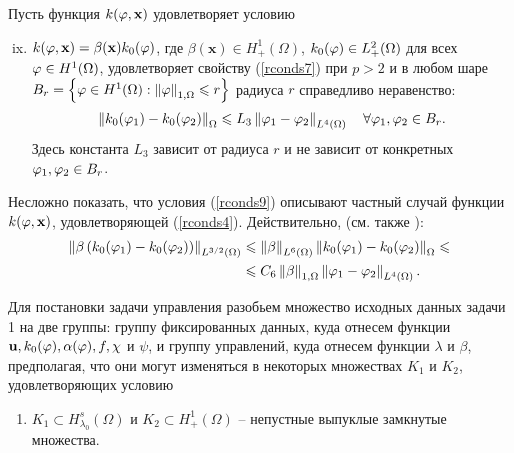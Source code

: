 Пусть функция $k(\varphi, \mathbf{x})$ удовлетворяет условию
\begin{enumerate}[(i)]
	\setcounter{enumi}{8}

	\item \label{rconds9}
		$k(\varphi, \mathbf{x}) = \beta (\mathbf{x}) k_0 (\varphi)$, где $\beta (\mathbf{x}) \in H^1_+ (\Omega)$, $k_0 (\varphi) \in L^2_+ (\Omega)$ для всех $\varphi \in H^1 (\Omega)$, удовлетворяет свойству (\ref{rconds7}) при $p>2$ и в любом шаре $B_r = \left\lbrace  \varphi \in H^1 (\Omega): \left\Vert \varphi \right\Vert_{1,\Omega} \leqslant r  \right\rbrace$ радиуса $r$ справедливо неравенство:
		\begin{equation}
			\label{x_eq}
			\left\Vert k_0 (\varphi_1) - k_0 (\varphi_2)  \right\Vert_{\Omega} 
			\leqslant L_3 \left\Vert \varphi_1 - \varphi_2 \right\Vert_{L^4 (\Omega)} 
			\quad \forall \varphi_1, \varphi_2 \in B_r.
		\end{equation}
		Здесь константа $L_3$ зависит от радиуса $r$ и не зависит от конкретных $\varphi_1, \varphi_2 \in B_r$.

\end{enumerate}

Несложно показать, что условия (\ref{rconds9}) описывают частный случай
функции $k(\varphi, \mathbf{x})$, удовлетворяющей (\ref{rconds4}). Действительно,
(см. также \cite{lit12}):
\[
	\begin{split}
		\left\Vert \beta \left( k_0 (\varphi_1) - k_0 (\varphi_2) \right) \right\Vert_{L^{3/2} (\Omega)} &\leqslant 
		\left\Vert \beta \right\Vert_{L^6 (\Omega)} \left\Vert k_0 (\varphi_1) - k_0 (\varphi_2) \right\Vert_\Omega \leqslant \\
		&\leqslant C_6 \left\Vert \beta \right\Vert_{1,\Omega} \left\Vert \varphi_1 - \varphi_2 \right\Vert_{L^4(\Omega)}.
	\end{split}
\]

Для постановки задачи управления разобьем множество исходных данных задачи 1 на две группы: группу фиксированных данных, куда отнесем функции $\mathbf{u}, k_0 (\varphi), \alpha (\varphi), f, \chi$ и $\psi$, и группу управлений, куда отнесем функции $\lambda$ и $\beta$, предполагая, что они могут изменяться в некоторых множествах $K_1$ и $K_2$, удовлетворяющих условию

\begin{enumerate}

	\item[\enumilab{jconds1}{(j)}]
		$K_1 \subset H^{s}_{\lambda_0} (\Omega)$ и $K_2 \subset H^{1}_{+} (\Omega)$ -- непустные выпуклые замкнутые множества.

\end{enumerate}

